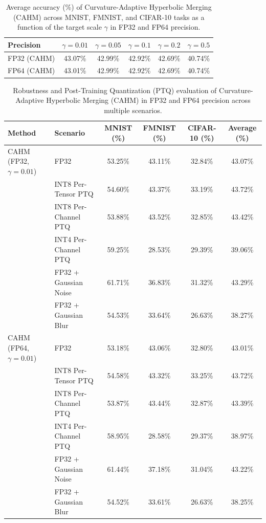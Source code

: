 \documentclass{article}
\theoremstyle{plain}
\theoremstyle{definition}
\theoremstyle{remark}
\begin{document}
\begin{table}[H]
\caption{Average accuracy (\%) of Curvature-Adaptive Hyperbolic Merging (CAHM) across MNIST, FMNIST, and CIFAR-10 tasks as a function of the target scale $\gamma$ in FP32 and FP64 precision.}
\label{tab:cahm_results}
\vskip 0.15in
\begin{center}
\begin{small}
\begin{tabular}{lccccc}
\toprule
Precision & $\gamma = 0.01$ & $\gamma = 0.05$ & $\gamma = 0.1$ & $\gamma = 0.2$ & $\gamma = 0.5$ \\
\midrule
FP32 (CAHM) & 43.07\% & 42.99\% & 42.92\% & 42.69\% & 40.74\% \\
FP64 (CAHM) & 43.01\% & 42.99\% & 42.92\% & 42.69\% & 40.74\% \\
\bottomrule
\end{tabular}
\end{small}
\end{center}
\vskip -0.1in
\end{table}

\begin{table}[H]
\caption{Robustness and Post-Training Quantization (PTQ) evaluation of Curvature-Adaptive Hyperbolic Merging (CAHM) in FP32 and FP64 precision across multiple scenarios.}
\label{tab:cahm_robustness}
\vskip 0.15in
\begin{center}
\begin{small}
\begin{tabular}{llcccc}
\toprule
Method & Scenario & MNIST (\%) & FMNIST (\%) & CIFAR-10 (\%) & Average (\%) \\
\midrule
CAHM (FP32, $\gamma = 0.01$) & FP32 & 53.25\% & 43.11\% & 32.84\% & 43.07\% \\
& INT8 Per-Tensor PTQ & 54.60\% & 43.37\% & 33.19\% & 43.72\% \\
& INT8 Per-Channel PTQ & 53.88\% & 43.52\% & 32.85\% & 43.42\% \\
& INT4 Per-Channel PTQ & 59.25\% & 28.53\% & 29.39\% & 39.06\% \\
& FP32 + Gaussian Noise & 61.71\% & 36.83\% & 31.32\% & 43.29\% \\
& FP32 + Gaussian Blur & 54.53\% & 33.64\% & 26.63\% & 38.27\% \\
\midrule
CAHM (FP64, $\gamma = 0.01$) & FP32 & 53.18\% & 43.06\% & 32.80\% & 43.01\% \\
& INT8 Per-Tensor PTQ & 54.58\% & 43.32\% & 33.25\% & 43.72\% \\
& INT8 Per-Channel PTQ & 53.87\% & 43.44\% & 32.87\% & 43.39\% \\
& INT4 Per-Channel PTQ & 58.95\% & 28.58\% & 29.37\% & 38.97\% \\
& FP32 + Gaussian Noise & 61.44\% & 37.18\% & 31.04\% & 43.22\% \\
& FP32 + Gaussian Blur & 54.52\% & 33.61\% & 26.63\% & 38.25\% \\
\bottomrule
\end{tabular}
\end{small}
\end{center}
\vskip -0.1in
\end{table}
\end{document}
